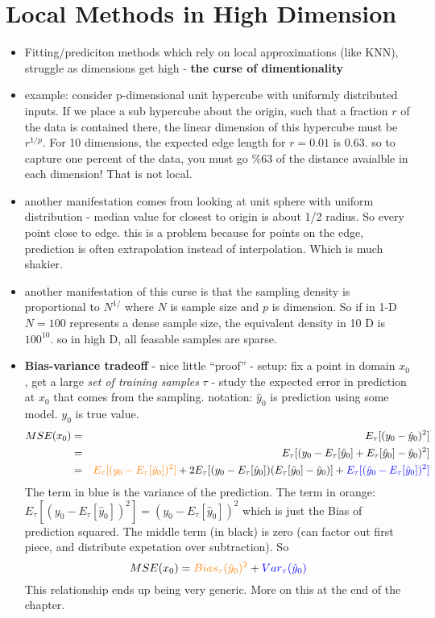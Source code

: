 \documentclass[a4paper]{report}
\newcommand{\<}{\textless}
\renewcommand{\>}{\textgreater}
\begin{document}
\section{Local Methods in High Dimension}
\begin{itemize}
  \item Fitting/prediciton methods which rely on local approximations (like KNN), struggle as dimensions get high - {\bf the curse of dimentionality}
  \item example: consider p-dimensional unit hypercube with uniformly distributed inputs. If we place a sub hypercube about the origin, such that a fraction $r$ of the data is contained there,
    the linear dimension of this hypercube must be $r^{1/p}$. For 10 dimensions, the expected edge length for $r=0.01$ is $0.63$.
    \subitem so to capture one percent of the data, you must go $\%63$ of the distance avaialble in each dimension! That is not local.
  \item another manifestation comes from looking at unit sphere with uniform distribution - median value for closest to origin is about 1/2 radius. So every point close to edge.
    \subitem this is a problem because for points on the edge, prediction is often extrapolation instead of interpolation. Which is much shakier.
  \item another manifestation of this curse is that the sampling density is proportional to $N^{1/}$ where $N$ is sample size and $p$ is dimension. So if in 1-D $N=100$ represents a dense sample size, the equivalent density in 10 D is $100^{10}$. 
    \subitem so in high D, all feasable samples are sparse.
  \item {\bf Bias-variance tradeoff} - nice little ``proof'' - setup: fix a point in domain $x_0$, get a large \emph{set of training samples} $\tau$ - study the expected error in prediction at $x_0$ that comes from the sampling.
    \subitem notation: $\hat{y}_0$ is prediction using some model. $y_0$ is true value.
    \begin{eqnarray}
      MSE(x_0) &=& E_\tau[(y_0 - \hat{y}_0)^2]\\
      	&=& E_\tau[(y_0 - E_\tau[\hat{y}_0] + E_\tau[\hat{y}_0] - \hat{y}_0)^2 ] \\
	&=& {\color{orange} E_\tau[(y_0 - E_\tau[\hat{y}_0])^2]} + 2E_\tau[(y_0 - E_\tau[\hat{y}_0])(E_\tau[\hat{y}_0] - \hat{y}_0)] +   {\color{blue} E_\tau[(\hat{y}_0 - E_\tau[\hat{y}_0])^2] }
      \end{eqnarray}
      The term in blue is the variance of the prediction.
      The term in orange: $E_\tau[(y_0 - E_\tau[\hat{y}_0])^2] = (y_0 - E_\tau[\hat{y}_0])^2$ which is just the Bias of prediction squared.
      The middle term (in black) is zero (can factor out first piece, and distribute expetation over subtraction). So
      \begin{equation}
      MSE(x_0) =  {\color{orange} Bias_\tau(\hat{y}_0)^2} + {\color{blue} Var_\tau(\hat{y}_0)}
    	\end{equation}
	This relationship ends up being very generic. More on this at the end of the chapter.
\end{itemize}
\end{document}
